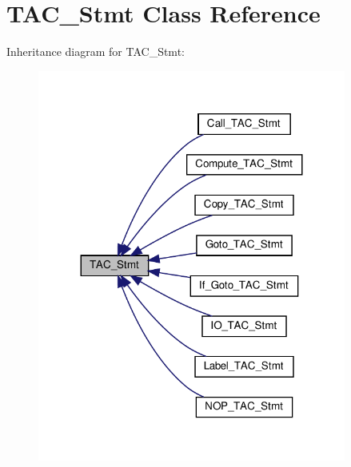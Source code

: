 \hypertarget{classTAC__Stmt}{}\section{T\+A\+C\+\_\+\+Stmt Class Reference}
\label{classTAC__Stmt}


Inheritance diagram for T\+A\+C\+\_\+\+Stmt\+:
\nopagebreak
\begin{figure}[H]
\begin{center}
\leavevmode
\includegraphics[width=287pt]{classTAC__Stmt__inherit__graph}
\end{center}
\end{figure}
